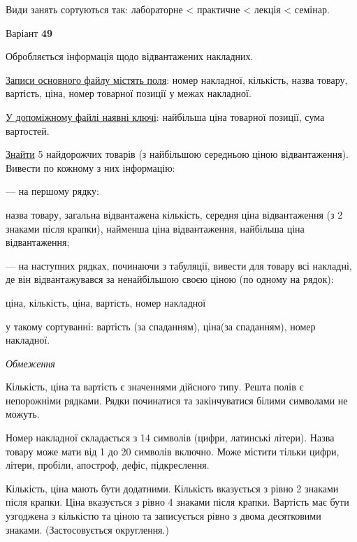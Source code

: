 \documentclass[11pt, ukrainian]{article}
\begin{document}
Види занять сортуються так: лабораторне < практичне < лекція < семінар.





\par
\newpage
{\center Варіант  \No \textbf { 49 }\par}
\bigskip
Обробляється інформація щодо відвантажених накладних.

\underline{Записи основного файлу містять поля}: номер накладної, кількість, назва товару, вартість, ціна, номер товарної позиції у межах накладної.

\underline{У допоміжному файлі наявні ключі}: найбільша ціна товарної позиції, сума вартостей.

\underline{Знайти} 5 найдорожчих товарів (з найбільшою середньою ціною відвантаження). Вивести по кожному з них інформацію:\par
{\noindent}--- на першому рядку:\par
назва товару, загальна відвантажена кількість, середня ціна відвантаження (з 2 знаками після крапки), найменша ціна відвантаження,  найбільша ціна відвантаження;

{\noindent}--- на наступних рядках, починаючи з табуляції, вивести для товару всі накладні, де він відвантажувався за ненайбільшою своєю ціною (по одному на рядок):\par
ціна, кількість, ціна, вартість, номер накладної

{\noindent}у такому сортуванні: вартість (за спаданням), ціна(за спаданням), номер накладної.


\bigskip\textit{Обмеження}

Кількість, ціна та вартість є значеннями дійсного типу.
Решта полів є непорожніми рядками.
Рядки починатися та закінчуватися білими символами не можуть.

Номер накладної складається з 14 символів (цифри, латинські літери).
Назва товару може мати від 1 до 20 символів включно.
Може містити тільки цифри, літери, пробіли, апостроф, дефіс, підкреслення.

Кількість, ціна мають бути додатними.
Кількість вказується з рівно 2 знаками після крапки.
Ціна вказується з рівно 4 знаками після крапки.
Вартість має бути узгоджена з кількістю та ціною та записується рівно з двома десятковими знаками.
(Застосовується округлення.)
\end{document}
